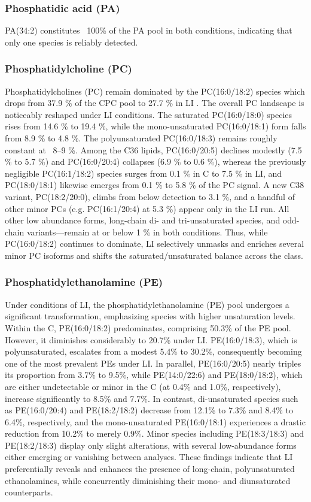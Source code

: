 \documentclass[10pt,letterpaper]{article}
\begin{document}
\subsubsection*{Phosphatidic acid (PA)} 
PA(34:2) constitutes ~100\% of the PA pool in both conditions, indicating that only one species is reliably detected.

\subsubsection*{Phosphatidylcholine (PC)} 
Phosphatidylcholines (PC) remain dominated by the PC(16:0/18:2) species which drops from 37.9 \% of the CPC pool to 27.7 \% in LI . The overall PC landscape is noticeably reshaped under LI conditions. The saturated PC(16:0/18:0) species rises from 14.6 \% to 19.4 \%, while the mono-unsaturated PC(16:0/18:1) form falls from 8.9 \% to 4.8 \%. The polyunsaturated PC(16:0/18:3) remains roughly constant at ~8–9 \%. Among the C36 lipids, PC(16:0/20:5) declines modestly (7.5 \% to 5.7 \%) and PC(16:0/20:4) collapses (6.9 \% to 0.6 \%), whereas the previously negligible PC(16:1/18:2) species surges from 0.1 \% in C to 7.5 \% in LI, and PC(18:0/18:1) likewise emerges from 0.1 \% to 5.8 \% of the PC signal. A new C38 variant, PC(18:2/20:0), climbs from below detection to 3.1 \%, and a handful of other minor PCs (e.g. PC(16:1/20:4) at 5.3 \%) appear only in the LI run. All other low abundance forms, long-chain di- and tri-unsaturated species, and odd-chain variants—remain at or below 1 \% in both conditions. Thus, while PC(16:0/18:2) continues to dominate, LI selectively unmasks and enriches several minor PC isoforms and shifts the saturated/unsaturated balance across the class.

\subsubsection*{Phosphatidylethanolamine (PE)} 
Under conditions of LI, the phosphatidylethanolamine (PE) pool undergoes a significant transformation, emphasizing species with higher unsaturation levels. Within the C, PE(16:0/18:2) predominates, comprising 50.3\% of the PE pool. However, it diminishes considerably to 20.7\% under LI. PE(16:0/18:3), which is polyunsaturated, escalates from a modest 5.4\% to 30.2\%, consequently becoming one of the most prevalent PEs under LI. In parallel, PE(16:0/20:5) nearly triples its proportion from 3.7\% to 9.5\%, while PE(14:0/22:6) and PE(18:0/18:2), which are either undetectable or minor in the C (at 0.4\% and 1.0\%, respectively), increase significantly to 8.5\% and 7.7\%. In contrast, di-unsaturated species such as PE(16:0/20:4) and PE(18:2/18:2) decrease from 12.1\% to 7.3\% and 8.4\% to 6.4\%, respectively, and the mono-unsaturated PE(16:0/18:1) experiences a drastic reduction from 10.2\% to merely 0.9\%. Minor species including PE(18:3/18:3) and PE(18:2/18:3) display only slight alterations, with several low-abundance forms either emerging or vanishing between analyses. These findings indicate that LI preferentially reveals and enhances the presence of long-chain, polyunsaturated ethanolamines, while concurrently diminishing their mono- and diunsaturated counterparts.
\end{document}
